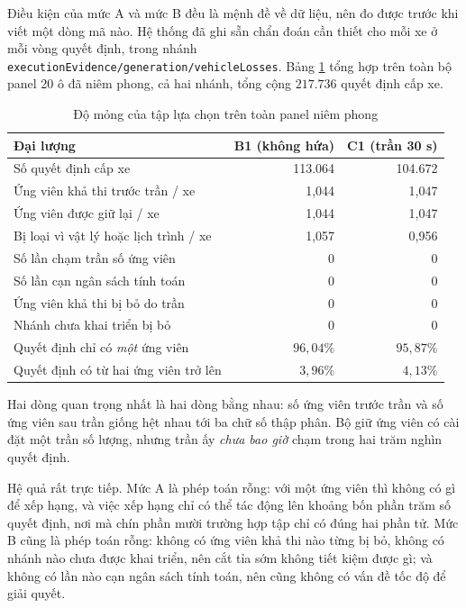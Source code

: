 Điều kiện của mức A và mức B đều là mệnh đề về dữ liệu, nên đo được trước khi viết một dòng mã
nào. Hệ thống đã ghi sẵn chẩn đoán cần thiết cho mỗi xe ở mỗi vòng quyết định, trong nhánh
\texttt{executionEvidence/generation/vehicleLosses}. Bảng \ref{bang:mong} tổng hợp trên toàn bộ
panel 20 ô đã niêm phong, cả hai nhánh, tổng cộng $217.736$ quyết định cấp xe.

\begin{table}[htbp]
\centering
\caption{Độ mỏng của tập lựa chọn trên toàn panel niêm phong}
\label{bang:mong}
\small
\begin{tabular}{@{}lrr@{}}
\toprule
\textbf{Đại lượng} & \textbf{B1 (không hứa)} & \textbf{C1 (trần 30 s)}\\
\midrule
Số quyết định cấp xe & 113.064 & 104.672\\
Ứng viên khả thi trước trần / xe & 1,044 & 1,047\\
Ứng viên được giữ lại / xe & 1,044 & 1,047\\
Bị loại vì vật lý hoặc lịch trình / xe & 1,057 & 0,956\\
\midrule
Số lần chạm trần số ứng viên & 0 & 0\\
Số lần cạn ngân sách tính toán & 0 & 0\\
Ứng viên khả thi bị bỏ do trần & 0 & 0\\
Nhánh chưa khai triển bị bỏ & 0 & 0\\
\midrule
Quyết định chỉ có \emph{một} ứng viên & $96{,}04\%$ & $95{,}87\%$\\
Quyết định có từ hai ứng viên trở lên & $3{,}96\%$ & $4{,}13\%$\\
\bottomrule
\end{tabular}
\end{table}

Hai dòng quan trọng nhất là hai dòng bằng nhau: số ứng viên trước trần và số ứng viên sau trần
giống hệt nhau tới ba chữ số thập phân. Bộ giữ ứng viên có cài đặt một trần số lượng, nhưng
trần ấy \emph{chưa bao giờ} chạm trong hai trăm nghìn quyết định.

Hệ quả rất trực tiếp. Mức A là phép toán rỗng: với một ứng viên thì không có gì để xếp hạng, và
việc xếp hạng chỉ có thể tác động lên khoảng bốn phần trăm số quyết định, nơi mà chín phần mười
trường hợp tập chỉ có đúng hai phần tử. Mức B cũng là phép toán rỗng: không có ứng viên khả thi
nào từng bị bỏ, không có nhánh nào chưa được khai triển, nên cắt tỉa sớm không tiết kiệm được
gì; và không có lần nào cạn ngân sách tính toán, nên cũng không có vấn đề tốc độ để giải quyết.

